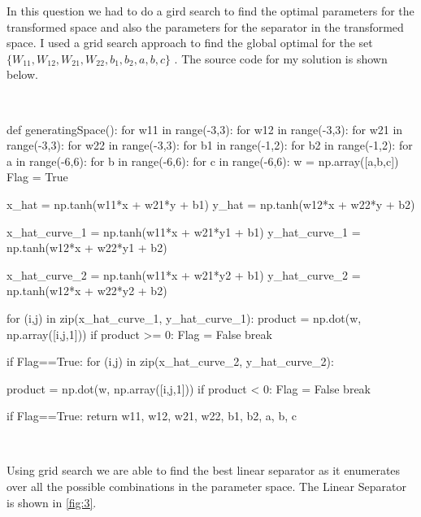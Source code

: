 \documentclass[12pt]{report}
\begin{document}
In this question we had to do a gird search to find the optimal parameters for the transformed space and also the parameters for the separator in the transformed space. I used a grid search approach to find the global  optimal for the set $\{W_{11},W_{12},W_{21},W_{22},b_1,b_2,a,b,c\}$ . The source code for my solution is shown below.

\

\begin{python}
	def generatingSpace():
		for w11 in range(-3,3):
			for w12 in range(-3,3):
				for w21 in range(-3,3):
					for w22 in range(-3,3):
						for b1 in range(-1,2):
							for b2 in range(-1,2):
								for a in range(-6,6):
									for b in range(-6,6):
										for c in range(-6,6):
											w = np.array([a,b,c])
											Flag = True
											
											x_hat = np.tanh(w11*x + w21*y + b1)
											y_hat = np.tanh(w12*x + w22*y + b2)
											
											x_hat_curve_1 = np.tanh(w11*x + w21*y1 + b1)
											y_hat_curve_1 = np.tanh(w12*x + w22*y1 + b2)
											
											x_hat_curve_2 = np.tanh(w11*x + w21*y2 + b1)
											y_hat_curve_2 = np.tanh(w12*x + w22*y2 + b2)
											
											for (i,j) in zip(x_hat_curve_1, y_hat_curve_1):
											product = np.dot(w, np.array([i,j,1]))
											if product >= 0:
											Flag = False
											break
											
											if Flag==True:
												for (i,j) in zip(x_hat_curve_2, y_hat_curve_2):
											
												product = np.dot(w, np.array([i,j,1]))
													if product < 0:
													Flag = False
													break
											
											if Flag==True:
												return w11, w12, w21, w22, b1, b2, a, b, c
\end{python}


\

Using grid search we are able to find the best linear separator as it enumerates over all the possible combinations in the parameter space. The Linear Separator  is shown  in \figurename{\ref{fig:3}}.
\end{document}
